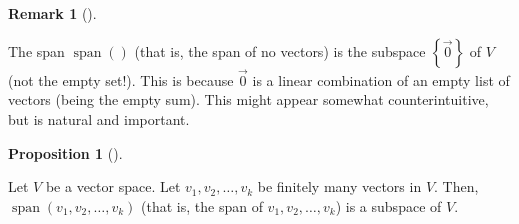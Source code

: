 \documentclass[numbers=enddot,12pt,final,onecolumn,notitlepage]{scrartcl}%
\theoremstyle{definition}
\newtheorem{prop}[theo]{Proposition}
\newenvironment{proposition}[1][]
{\begin{prop}[#1]\begin{leftbar}}
{\end{leftbar}\end{prop}}
\newtheorem{remk}[theo]{Remark}
\newenvironment{remark}[1][]
{\begin{remk}[#1]\begin{leftbar}}
{\end{leftbar}\end{remk}}
\begin{document}
\begin{remark}
The span $\operatorname{span}\left(  {}\right)  $ (that is, the span of no
vectors) is the subspace $\left\{  \overrightarrow{0}\right\}  $ of $V$ (not
the empty set!). This is because $\overrightarrow{0}$ is a linear combination
of an empty list of vectors (being the empty sum). This might appear somewhat
counterintuitive, but is natural and important.
\end{remark}

\begin{proposition}
\label{prop.subspace.span}Let $V$ be a vector space. Let $v_{1},v_{2}%
,\ldots,v_{k}$ be finitely many vectors in $V$. Then, $\operatorname{span}%
\left(  v_{1},v_{2},\ldots,v_{k}\right)  $ (that is, the span of $v_{1}%
,v_{2},\ldots,v_{k}$) is a subspace of $V$.
\end{proposition}
\end{document}
